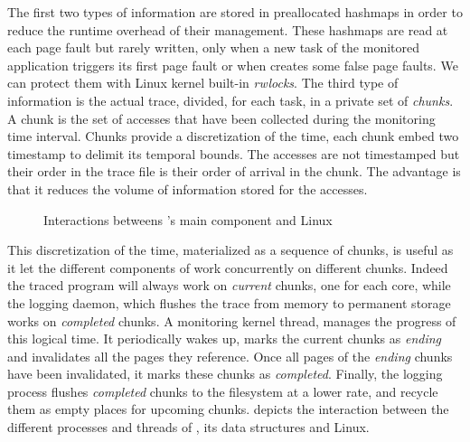 The first two types of information are stored in preallocated hashmaps in order to reduce the
runtime overhead of their management.  These hashmaps are read at each page fault but rarely
written, only when a new task of the monitored application triggers its first page
fault or when \Moca creates some false page faults. We can protect
them with Linux kernel built-in \emph{rwlocks}.
The third type of information is the actual
trace, divided, for each task, in a private set of \emph{chunks}. A chunk is the set of
accesses that have been collected during the monitoring time interval. Chunks provide a discretization
of the time, each chunk embed two timestamp to delimit its temporal bounds.
The accesses are not timestamped but their order in the trace file is their
order of arrival in the chunk.
The advantage is that it reduces the volume of information stored for the accesses.

\begin{figure}[htb]
    \centering
    \caption{Interactions betweens \Moca's main component and Linux}
    \label{fig:moca}
\end{figure}

This discretization of the time, materialized as a sequence of chunks, is useful as it let the
different components of \Moca work concurrently on different chunks.  Indeed the traced
program will always work on \emph{current} chunks, one for each core, while the logging daemon,
which flushes the trace from memory to permanent storage works on \emph{completed} chunks. A
monitoring kernel thread, manages the progress of this logical time. It periodically wakes up, marks the current chunks as
\emph{ending} and invalidates all the pages they reference. Once all pages of the \emph{ending}
chunks have been invalidated, it marks these chunks as \emph{completed}. Finally, the
logging process flushes \emph{completed} chunks to the filesystem at a lower
rate, and recycle them as empty places for upcoming chunks.   depicts the interaction between the
different processes and threads of \Moca, its data structures and Linux.


